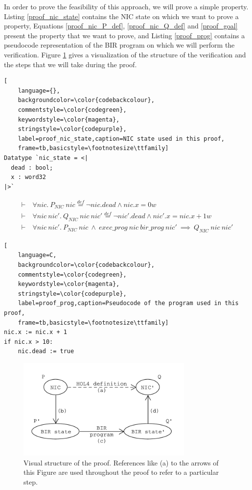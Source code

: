 \documentclass{kththesis}
\newcommand{\eqdef}{\stackrel{def}{=}}
\begin{document}
{%

In order to prove the feasibility of this approach, we will prove a simple property. Listing \ref{proof_nic_state} contains the NIC state on which we want to prove a property, Equations \ref{proof_nic_P_def}, \ref{proof_nic_Q_def} and \ref{proof_goal} present the property that we want to prove, and Listing \ref{proof_prog} contains a pseudocode representation of the BIR program on which we will perform the verification. Figure \ref{proof_schema} gives a visualization of the structure of the verification and the steps that we will take during the proof. 

\begin{lstlisting}[
    language={},
    backgroundcolor=\color{codebackcolour},
    commentstyle=\color{codegreen},
    keywordstyle=\color{magenta},
    stringstyle=\color{codepurple},
    label=proof_nic_state,caption=NIC state used in this proof,
    frame=tb,basicstyle=\footnotesize\ttfamily]
Datatype `nic_state = <|
  dead : bool;
  x : word32
|>`
\end{lstlisting}

\begin{small}
\begin{align}
\label{proof_nic_P_def}
\vdash~&\forall nic.~P_{NIC}~nic \eqdef \neg nic.dead \land nic.x = 0w\\
%
\label{proof_nic_Q_def}
\vdash~&\forall nic~nic'.~Q_{NIC}~nic~nic' \eqdef \neg nic'.dead \land nic'.x = nic.x + 1w\\
%
\label{proof_goal}
\vdash~&\forall nic~nic'.~P_{NIC}~nic~\land~exec\_prog~nic~bir\_prog~nic'~\implies~Q_{NIC}~nic~nic'
\end{align}
\end{small}

\begin{lstlisting}[
    language=C,
    backgroundcolor=\color{codebackcolour},
    commentstyle=\color{codegreen},
    keywordstyle=\color{magenta},
    stringstyle=\color{codepurple},
    label=proof_prog,caption=Pseudocode of the program used in this proof,
    frame=tb,basicstyle=\footnotesize\ttfamily]
nic.x := nic.x + 1
if nic.x > 10:
    nic.dead := true
\end{lstlisting}

\begin{figure}[!h]
	\includegraphics[height=5cm]{figures/proof_schema.pdf}
	\centering
	\caption{Visual structure of the proof. References like (a) to the arrows of this Figure are used throughout the proof to refer to a particular step.}
	\label{proof_schema}
\end{figure}

}
\end{document}
